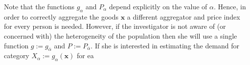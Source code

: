 \documentclass[english, a4paper,12pt]{article}
\begin{document}
Note that the functions $g_{\alpha}$ and $P_{\alpha}$ depend explicitly on the value of $\alpha$. Hence, in order to correctly aggregate the goods $\mathbf{x}$ a different aggregator and price index for every person is needed. However, if the investigator is not aware of (or concerned with) the heterogeneity of the population then she will use a single function $g := g_{\overline{\alpha}}$ and $P := P_{\overline{\alpha}}$. If she is interested in estimating the demand for category $X_{\alpha} := g_{\alpha}(\mathbf{x})$ for ea






\end{document}

